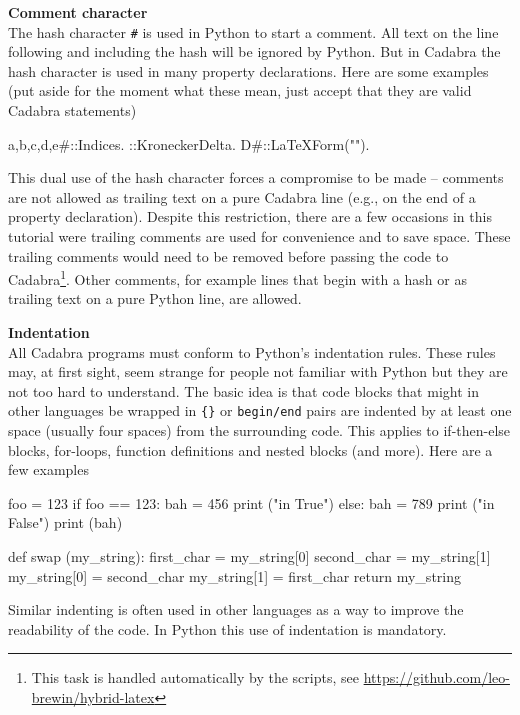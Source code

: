 \documentclass[a4paper,12pt]{article}
\numberwithin{equation}{section}%
\begin{document}
{\bf Comment character}\\[5pt]
The hash character \verb|#| is used in Python to start a comment. All text on the line
following and including the hash will be ignored by Python. But in Cadabra the hash
character is used in many property declarations. Here are some examples (put aside for the
moment what these mean, just accept that they are valid Cadabra statements)
\begin{cadabra}[numbers=none]
   {a,b,c,d,e#}::Indices.
   \delta{#}::KroneckerDelta.
   D{#}::LaTeXForm("\nabla").
\end{cadabra}
This dual use of the hash character forces a compromise to be made -- comments are not
allowed as trailing text on a pure Cadabra line (e.g., on the end of a property
declaration). Despite this restriction, there are a few occasions in this tutorial were
trailing comments are used for convenience and to save space. These trailing comments would
need to be removed before passing the code to Cadabra\footnote{This task is handled
automatically by the  scripts, see
\url{https://github.com/leo-brewin/hybrid-latex}}. Other comments, for example lines that
begin with a hash or as trailing text on a pure Python line, are allowed.

{\bf Indentation}\\[5pt]
All Cadabra programs must conform to Python's indentation rules. These rules may,
at first sight, seem strange for people not familiar with Python but they are not
too hard to understand. The basic idea is that code blocks that might in other
languages be wrapped in \verb|{}| or \verb|begin/end| pairs are indented by at least
one space (usually four spaces) from the surrounding code. This applies to
if-then-else blocks, for-loops, function definitions and nested blocks (and more).
Here are a few examples
\begin{cadabra}[numbers=none]
   foo = 123
   if foo == 123:
      bah = 456
      print ("in True")
   else:
      bah = 789
      print ("in False")
   print (bah)

   def swap (my_string):
       first_char   = my_string[0]
       second_char  = my_string[1]
       my_string[0] = second_char
       my_string[1] = first_char
       return my_string
\end{cadabra}
Similar indenting is often used in other languages as a way to improve the
readability of the code. In Python this use of indentation is mandatory.
\end{document}
